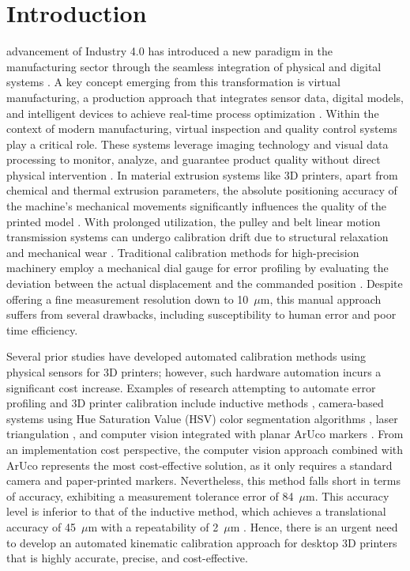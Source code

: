 \section{Introduction}
 advancement of Industry 4.0 has introduced a new paradigm in the manufacturing sector through the seamless integration of physical and digital systems \cite{soori2024}. A key concept emerging from this transformation is virtual manufacturing, a production approach that integrates sensor data, digital models, and intelligent devices to achieve real-time process optimization \cite{soori2024}. Within the context of modern manufacturing, virtual inspection and quality control systems play a critical role\cite{soori2024}. These systems leverage imaging technology and visual data processing to monitor, analyze, and guarantee product quality without direct physical intervention \cite{soori2024}. In material extrusion systems like 3D printers, apart from chemical and thermal extrusion parameters, the absolute positioning accuracy of the machine's mechanical movements significantly influences the quality of the printed model \cite{zaborniak2024}. With prolonged utilization, the pulley and belt linear motion transmission systems can undergo calibration drift due to structural relaxation and mechanical wear \cite{xu2020, zaborniak2024, papageorgiou2019}. Traditional calibration methods for high-precision machinery employ a mechanical dial gauge for error profiling by evaluating the deviation between the actual displacement and the commanded position \cite{iso230_1_2012}. Despite offering a fine measurement resolution down to 10~$\mu$m, this manual approach suffers from several drawbacks, including susceptibility to human error and poor time efficiency.

Several prior studies have developed automated calibration methods using physical sensors for 3D printers; however, such hardware automation incurs a significant cost increase. Examples of research attempting to automate error profiling and 3D printer calibration include inductive methods \cite{Schouten2022}, camera-based systems using Hue Saturation Value (HSV) color segmentation algorithms \cite{Chen2025}, laser triangulation \cite{Munteanu2021}, and computer vision integrated with planar ArUco markers \cite{Owais2026}. From an implementation cost perspective, the computer vision approach combined with ArUco represents the most cost-effective solution, as it only requires a standard camera and paper-printed markers. Nevertheless, this method falls short in terms of accuracy, exhibiting a measurement tolerance error of 84~$\mu$m. This accuracy level is inferior to that of the inductive method, which achieves a translational accuracy of 45~$\mu$m with a repeatability of 2~$\mu$m \cite{Schouten2022}. Hence, there is an urgent need to develop an automated kinematic calibration approach for desktop 3D printers that is highly accurate, precise, and cost-effective.

